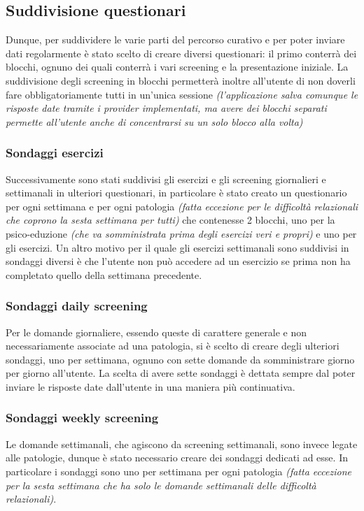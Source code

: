 \subsection{Suddivisione questionari}
Dunque, per suddividere le varie parti del percorso curativo e per poter inviare dati regolarmente è stato scelto di creare diversi questionari: il primo conterrà dei blocchi, ognuno dei quali conterrà i vari screening e la presentazione iniziale. La suddivisione degli screening in blocchi permetterà inoltre all'utente di non doverli fare obbligatoriamente tutti in un'unica sessione \textit{(l'applicazione salva comunque le risposte date tramite i provider implementati, ma avere dei blocchi separati permette all'utente anche di concentrarsi su un solo blocco alla volta)}

\subsubsection{Sondaggi esercizi}
Successivamente sono stati suddivisi gli esercizi e gli screening giornalieri e settimanali in ulteriori questionari, in particolare è stato creato un questionario per ogni settimana e per ogni patologia \textit{(fatta eccezione per le difficoltà relazionali che coprono la sesta settimana per tutti)} che contenesse 2 blocchi, uno per la psico-eduzione \textit{(che va somministrata prima degli esercizi veri e propri)} e uno per gli esercizi. Un altro motivo per il quale gli esercizi settimanali sono suddivisi in sondaggi diversi è che l'utente non può accedere ad un esercizio se prima non ha completato quello della settimana precedente.

\subsubsection{Sondaggi daily screening}
Per le domande giornaliere, essendo queste di carattere generale e non necessariamente associate ad una patologia, si è scelto di creare degli ulteriori sondaggi, uno per settimana, ognuno con sette domande da somministrare giorno per giorno all'utente. La scelta di avere sette sondaggi è dettata sempre dal poter inviare le risposte date dall'utente in una maniera più continuativa.

\subsubsection{Sondaggi weekly screening}
Le domande settimanali, che agiscono da screening settimanali, sono invece legate alle patologie, dunque è stato necessario creare dei sondaggi dedicati ad esse. In particolare i sondaggi sono uno per settimana per ogni patologia \textit{(fatta eccezione per la sesta settimana che ha solo le domande settimanali delle difficoltà relazionali)}.

